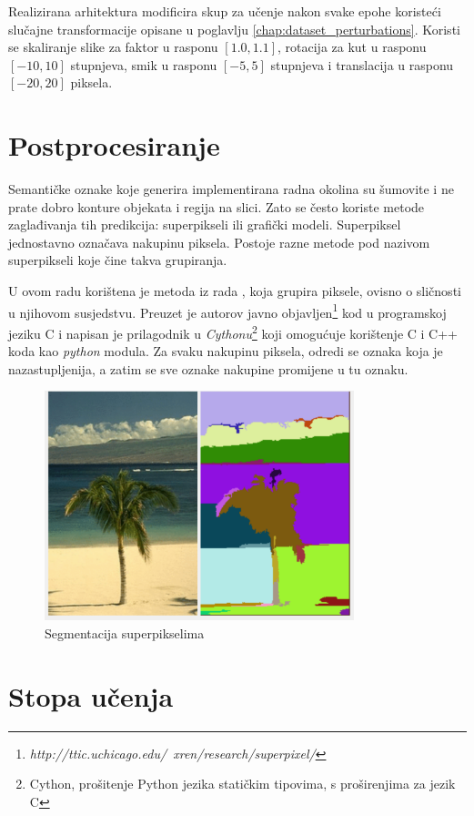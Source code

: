 \documentclass[times, utf8, diplomski, numeric]{fer}
\begin{document}
Realizirana arhitektura modificira skup za učenje nakon svake epohe koristeći slučajne transformacije opisane u poglavlju \ref{chap:dataset_perturbations}. Koristi se skaliranje slike za faktor u rasponu $[1.0, 1.1]$, rotacija za kut u rasponu $[-10, 10]$ stupnjeva, smik u rasponu $[-5, 5]$ stupnjeva i translacija u rasponu $[-20, 20]$ piksela.


\section{Postprocesiranje}

Semantičke oznake koje generira implementirana radna okolina su šumovite i ne prate dobro konture objekata i regija na slici. Zato se često koriste metode zaglađivanja tih predikcija: superpikseli ili grafički modeli. Superpiksel jednostavno označava nakupinu piksela. Postoje razne metode pod nazivom superpikseli koje čine takva grupiranja.

U ovom radu korištena je metoda iz rada \cite{Felzenszwalb04}, koja grupira piksele, ovisno o sličnosti u njihovom susjedstvu. Preuzet je autorov javno objavljen\footnote{\textit{http://ttic.uchicago.edu/~xren/research/superpixel/}} kod u programskoj jeziku C i napisan je prilagodnik u \textit{Cythonu}\footnote{Cython, prošitenje Python jezika statičkim tipovima, s proširenjima za jezik C} koji omogućuje korištenje C i C++ koda kao \textit{python} modula. Za svaku nakupinu piksela, odredi se oznaka koja je nazastupljenija, a zatim se sve oznake nakupine promijene u tu oznaku.

\begin{figure}[tb]
\centering
\includegraphics[width=340px]{imgs/superpixel.png}
\caption{Segmentacija superpikselima}
\end{figure}

\section{Stopa učenja}
\end{document}
